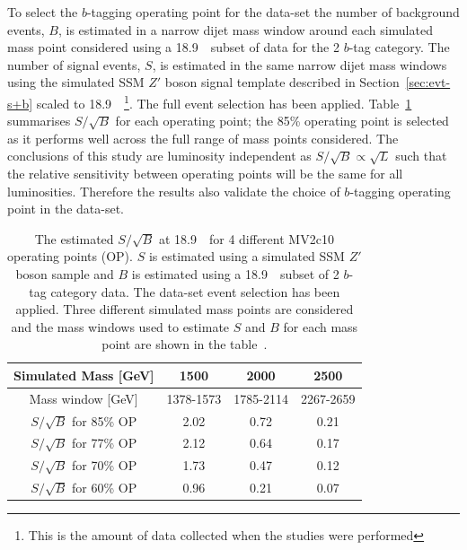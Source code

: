 To select the  $b$-tagging operating point for the \hm{} data-set
the number of background events, $B$, is estimated in
a narrow dijet mass window around
each simulated mass point considered using a
18.9~\ifb~subset of data for the 2 $b$-tag category.
The number of signal events, $S$, is estimated
in the same narrow dijet mass windows using 
the simulated SSM $Z'$ boson signal template
described in Section~\ref{sec:evt-s+b} scaled to 18.9~\ifb~\footnote{This is
  the amount of data collected when the studies were performed}.
The full \hm{} event selection has been applied.
Table~\ref{tab:evt-btag_hm} summarises $S/\sqrt{B}$ for each operating point;
the 85\% operating point is selected as it performs well across the full range of mass points considered.
The conclusions of this study are luminosity independent
as $S/\sqrt{B} \propto \sqrt{L}$ such that the relative sensitivity
between operating points will be the same for all luminosities.
Therefore the results also validate the choice of $b$-tagging operating point in the \summer{} data-set.

\vspace{-0.4em}
\begin{table}[ht]
\begin{center}
\begin{tabular}{|c||c|c|c|}
  \hline
  Simulated Mass [GeV]        &  1500  &   2000  &  2500  \\
  \hline
  Mass window [GeV]               & 1378-1573       &  1785-2114   &  2267-2659 \\
  \hline
  $S/\sqrt{B}$ for 85\% OP        &  2.02           &  0.72        &  0.21          \\
  $S/\sqrt{B}$ for 77\% OP        &  2.12           &  0.64        &  0.17          \\
  $S/\sqrt{B}$ for 70\% OP        &  1.73           &  0.47        &  0.12          \\
  $S/\sqrt{B}$ for 60\% OP        &  0.96           &  0.21        &  0.07          \\ \hline
\end{tabular}
\caption[The estimated $S/\sqrt{B}$ at 18.9~\ifb~for 4 different MV2c10 operating points (OP).
  $S$ is estimated using a simulated SSM $Z'$ boson sample and $B$ is estimated using a 18.9~\ifb~subset of 2 $b$-tag category data.
  The \hm{} data-set event selection has been applied.
  Three different simulated mass points are considered and the mass windows used
  to estimate $S$ and $B$ for each mass point are shown in the table.]
        {The estimated $S/\sqrt{B}$ at 18.9~\ifb~for 4 different MV2c10 operating points (OP).
          $S$ is estimated using a simulated SSM $Z'$ boson sample and $B$ is estimated using a 18.9~\ifb~subset of 2 $b$-tag category data.
          The \hm{} data-set event selection has been applied.
          Three different simulated mass points are considered and the mass windows used
          to estimate $S$ and $B$ for each mass point are shown in the table~\cite{dibjet-full_int}.}
        \label{tab:evt-btag_hm}        
\end{center}
\vspace{-2em}
\end{table}

